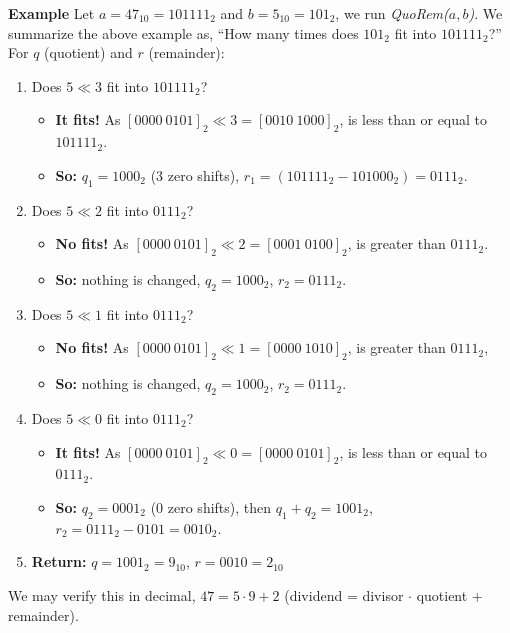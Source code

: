 \noindent
\newpage

\begin{Example}

    \label{ex:quotient_remainder}

\textbf{Example} Let $a = 47_{10} = 101111_2$ and $b = 5_{10} = 101_2$, we run \textit{QuoRem($a,b$)}. 
We summarize the above example as, ``How many times does $101_2$ fit into $101111_2$?''\\

\noindent
For $q$ (quotient) and $r$ (remainder):
\begin{enumerate}
    \item  Does $5\ll 3$ fit into $101111_2$? 
    \begin{itemize}
        \item \textbf{It fits!} As $[0000\ 0101]_2 \ll 3 = [0010\ 1000]_2$, is less than or equal to $101111_2$.
        \item \textbf{So:} $q_1=1000_2$ (3 zero shifts), $r_1 = (101111_2 - 101000_2) = 0111_2$.
    \end{itemize}
    \item  Does $5\ll 2$ fit into $0111_2$?
    \begin{itemize}
        \item \textbf{No fits!} As $[0000\ 0101]_2 \ll 2 = [0001\ 0100]_2$, is greater than $0111_2$.
        \item \textbf{So:} nothing is changed, $q_2=1000_2$, $r_2 = 0111_2$.
    \end{itemize}
    \item  Does $5\ll 1$ fit into $0111_2$?
    \begin{itemize}
        \item \textbf{No fits!} As $[0000\ 0101]_2 \ll 1 = [0000\ 1010]_2$, is greater than $0111_2$,
        \item \textbf{So:} nothing is changed, $q_2=1000_2$, $r_2 = 0111_2$.
    \end{itemize}
    \item  Does $5\ll 0$ fit into $0111_2$?
    \begin{itemize}
        \item \textbf{It fits!} As $[0000\ 0101]_2 \ll 0 = [0000\ 0101]_2$, is less than or equal to $0111_2$.
        \item \textbf{So:} $q_2=0001_2$ (0 zero shifts), then $q_1 + q_2 = 1001_2$, $r_2 = 0111_2-0101 = 0010_2$.
    \end{itemize}
    \item  \textbf{Return:} $q=1001_2=9_{10}$, $r = 0010 = 2_{10}$ 
\end{enumerate}

\vspace{2em}
\noindent
We may verify this in decimal, $47 = 5 \cdot 9 + 2$ (dividend = divisor $\cdot$ quotient + remainder).
\end{Example}

